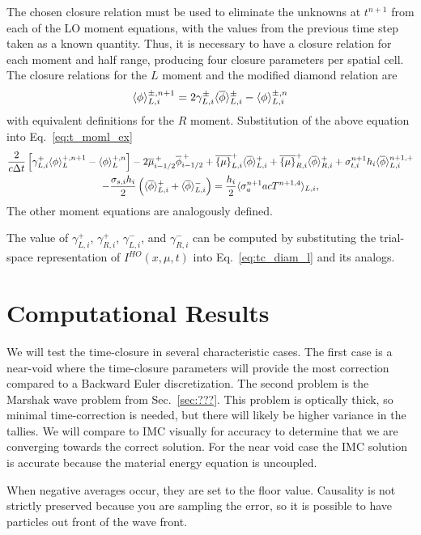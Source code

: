 The chosen closure relation must be used to eliminate the unknowns at $t^{n+1}$ from each
of the LO moment equations, with the values from the previous time step taken as a known quantity.  Thus, it is necessary to have a closure relation for each moment and half
range, producing four closure parameters per spatial cell.  The closure relations for the
$L$ moment and the modified diamond relation are
\begin{equation}\label{eq:tc_diam_l}
    \langle \phi \rangle_{L,i}^{\pm,n+1} = 2 \gamma_{L,i}^{\pm}\langle \overline\phi \rangle_{L,i}^{\pm} -
    \langle \phi \rangle_{L,i}^{\pm,n}
\end{equation}
with equivalent definitions for the $R$ moment.  Substitution of the above equation into
Eq.~\eqref{eq:t_moml_ex}
\begin{multline}
    \frac{2}{c\Delta t}\left[ \gamma_{L,i}^{+} \langle \phi \rangle_L^{+,n+1} - \langle \phi \rangle_L^{+,n} \right]
    -2\overline {\mu}_{i-1/2}^{\,+} \overline \phi_{i-1/2}^{\,+} + \overline{\left\{ \mu \right\}}_{L,i}^{+}
  \langle \overline{\phi} \rangle_{L,i}^{+}
  +  \overline{\left\{ \mu \right\}}_{R,i}^{+}
  \langle \overline{\phi} \rangle_{R,i}^{+} +  \sigma_{t,i}^{n+1} h_i 
  \langle \overline\phi \rangle_{L,i}^{n+1,+} \\-  \frac{\sigma_{s,i} h_i}{2} \left( \langle \overline{\phi} \rangle_{L,i}^{+} +
  \langle \overline{\phi} \rangle_{L,i}^{-}\right) = \frac{h_i}{2} \langle \sigma_a^{n+1} a c T^{n+1,4} \rangle_{L,i},
\end{multline}
The other moment equations are analogously defined.  

The value of $\gamma_{L,i}^+$, $\gamma_{R,i}^+$, $\gamma_{L,i}^-$, and $\gamma_{R,i}^-$
can be computed by substituting the trial-space representation of $I^{HO}(x,\mu,t)$ into
Eq.~\eqref{eq:tc_diam_l} and its analogs.


\section{Computational Results}

We will test the time-closure in several characteristic cases.  The first case is a
near-void where the time-closure parameters will provide the most correction compared to a
Backward Euler discretization.  The second problem is the Marshak wave problem from
Sec.~\ref{sec:???}.  This problem is optically thick, so minimal time-correction is
needed, but there will likely be higher variance in the tallies. We will compare to IMC
visually for accuracy to determine that we are converging towards the correct solution.
For the near void case the IMC solution is accurate because the material energy equation
is uncoupled.

When negative averages occur, they are set to the floor value. Causality is not strictly
preserved because you are sampling the error, so it is possible to have particles out
front of the wave front.



